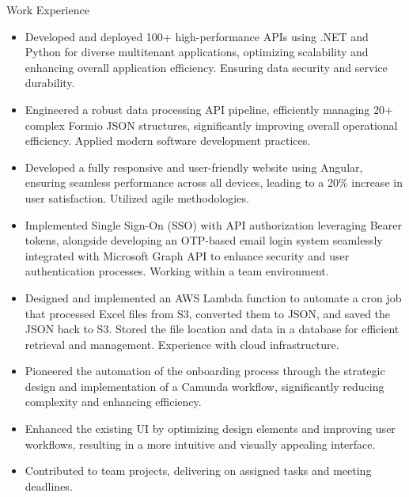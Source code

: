 \documentclass{resume}
\begin{document}
\begin{experienceSection}{Work Experience}
    \experienceItem[
        company={EXL Digital},
        location={Noida Sec-144},
        position={FullStack Developer},
        duration={Aug 2023 -- Present}
    ]
    \begin{itemize}
        \itemsep -6pt
        \item Developed and deployed 100+ high-performance APIs using .NET and Python for diverse multitenant applications, optimizing scalability and enhancing overall application efficiency.  Ensuring data security and service durability.
        \item Engineered a robust data processing API pipeline, efficiently managing 20+ complex Formio JSON structures, significantly improving overall operational efficiency.  Applied modern software development practices.
        \item Developed a fully responsive and user-friendly website using Angular, ensuring seamless performance across all devices, leading to a 20\% increase in user satisfaction.  Utilized agile methodologies.
        \item Implemented Single Sign-On (SSO) with API authorization leveraging Bearer tokens, alongside developing an OTP-based email login system seamlessly integrated with Microsoft Graph API to enhance security and user authentication processes.  Working within a team environment.
        \item Designed and implemented an AWS Lambda function to automate a cron job that processed Excel files from S3, converted them to JSON, and saved the JSON back to S3. Stored the file location and data in a database for efficient retrieval and management.  Experience with cloud infrastructure.
        \item Pioneered the automation of the onboarding process through the strategic design and implementation of a Camunda workflow, significantly reducing complexity and enhancing efficiency.
    \end{itemize}
    \experienceItem[
        company={Nokia},
        location={Chennai},
        position={Web Developer Intern},
        duration={Jun 2018 -- Jul 2018}
    ]
    \begin{itemize}
        \itemsep -6pt
        \item Enhanced the existing UI by optimizing design elements and improving user workflows, resulting in a more intuitive and visually appealing interface.
        \item Contributed to team projects, delivering on assigned tasks and meeting deadlines.
    \end{itemize}
\end{experienceSection}
\end{document}

